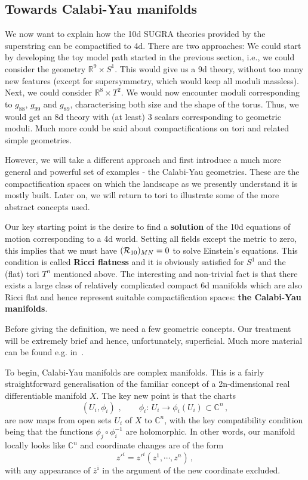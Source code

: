 \documentclass[12pt]{article}
\newcommand{\be}{\begin{equation}}
\newcommand{\ee}{\end{equation}}
\newcommand{\ol}{\overline}
\numberwithin{equation}{section}
\begin{document}
\subsection{Towards Calabi-Yau manifolds}

We now want to explain how the 10d SUGRA theories provided by the superstring can be compactified to 4d. There are two approaches: We could start by developing the toy model path started in the previous section, i.e., we could consider the geometry $\mathbb{R}^9\times S^1$. This would give us a 9d theory, without too many new features (except for supersymmetry, which would keep all moduli massless). Next, we could consider $\mathbb{R}^8\times T^2$. We would now encounter moduli corresponding to $g_{88}$, $g_{99}$ and $g_{89}$, characterising both size and the shape of the torus. Thus, we would get an 8d theory with (at least) 3 scalars corresponding to geometric moduli. Much more could be said about compactifications on tori and related simple geometries. 

However, we will take a different approach and first introduce a much more general and powerful set of examples - the Calabi-Yau geometries. These are the compactification spaces on which the landscape as we presently understand it is mostly built. Later on, we will return to tori to illustrate some of the more abstract concepts used. 

Our key starting point is the desire to find a {\bf solution} of the 10d equations of motion corresponding to a 4d world. Setting all fields except the metric to zero, this implies that we must have $({\cal R}_{10})_{MN}=0$ to solve Einstein's equations. This condition is called {\bf Ricci flatness} and it is obviously satisfied for $S^1$ and the (flat) tori $T^n$ mentioned above.  The interesting and non-trivial fact is that there exists a large class of relatively complicated compact 6d manifolds which are also Ricci flat and hence represent suitable compactification spaces: {\bf the Calabi-Yau manifolds}.

Before giving the definition, we need a few geometric concepts. Our treatment will be extremely brief and hence, unfortunately, superficial. Much more material can be found e.g. in~\cite{Green:1987sp, Blumenhagen:2013fgp, Candelas:1987is, Greene:1996cy, hub, He:2018jtw, Anderson:2018pui}.

To begin, Calabi-Yau manifolds are complex manifolds. This is a fairly straightforward generalisation of the familiar concept of a 2n-dimensional real differentiable manifold $X$. The key new point is that the charts
\be
(U_i,\phi_i)\,\,,\qquad \phi_i:\,U_i \to \phi_i(U_i)\subset \mathbb{C}^n\,,
\ee
are now maps from open sets $U_i$ of $X$ to $\mathbb{C}^n$, with the key compatibility condition being that the functions $\phi_j\circ \phi_i^{-1}$ are holomorphic. In other words, our manifold locally looks like $\mathbb{C}^n$ and coordinate changes are of the form 
\be
z'^i=z'^i(z^1,\cdots,z^n)\,,
\ee
with any appearance of $\ol{z}^{\ol{\imath}}$ in the argument of the new coordinate excluded. 
\end{document}
